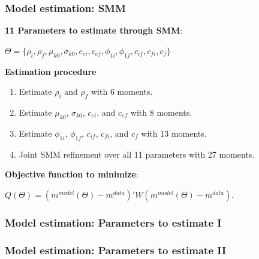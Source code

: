\documentclass[aspectratio=169]{beamer}
\begin{document}
\begin{frame}[noframenumbering]
\frametitle{\textbf{Model estimation}: SMM} \label{model_estimation}

\textbf{11 Parameters to estimate through SMM}: 
\begin{center}
    $\Theta = \{\rho_i, \rho_f, \mu_{k0}, \sigma_{k0}, c_{ei}, c_{ef}, \phi_{1i}, \phi_{1f}, c_{if}, c_{fi}, c_{f}\}$
\end{center}

\vspace{5mm}

\textbf{Estimation procedure}

\begin{enumerate}
    \item Estimate $\rho_{i}$ and $\rho_{f}$ with 6 moments.
    \item Estimate $\mu_{k0}$, $\sigma_{k0}$, $c_{ei}$, and $c_{ef}$ with 8 moments.
    \item Estimate $\phi_{1i}$, $\phi_{1f}$, $c_{if}$, $c_{fi}$, and $c_f$ with 13 moments.
    \item Joint SMM refinement over all 11 parameters with 27 moments.
\end{enumerate}

\vspace{5mm}

\textbf{Objective function to minimize}:

\begin{center}
    $Q(\Theta) = (m^{model}(\Theta) - m^{data})' W (m^{model}(\Theta) - m^{data})$.
\end{center}

\hyperlink{model}{}

\end{frame}


\begin{frame}[noframenumbering]
\frametitle{\textbf{Model estimation}: Parameters to estimate I} \label{parameters1}

\footnotesize


\hyperlink{model}{}

\end{frame}


\begin{frame}[noframenumbering]
\frametitle{\textbf{Model estimation}: Parameters to estimate II} \label{parameters2}

\begin{center}
    \footnotesize
    
\end{center}

\hyperlink{model}{}

\end{frame}

\end{document}
